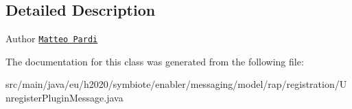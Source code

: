 \subsection{Detailed Description}
\begin{DoxyAuthor}{Author}
\href{mailto:m.pardi@nextworks.it}{\tt Matteo Pardi} 
\end{DoxyAuthor}


The documentation for this class was generated from the following file\+:\begin{DoxyCompactItemize}
\item 
src/main/java/eu/h2020/symbiote/enabler/messaging/model/rap/registration/Unregister\+Plugin\+Message.\+java\end{DoxyCompactItemize}
